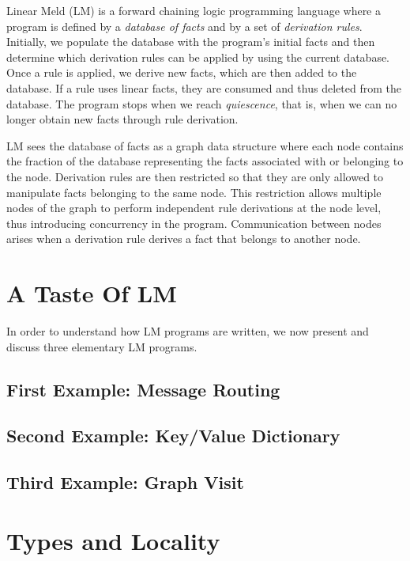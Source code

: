 
Linear Meld (LM) is a forward chaining logic programming language where a
program is defined by a \emph{database of facts} and by a set of
\emph{derivation rules}. Initially, we populate the database with the program's
initial facts and then determine which derivation rules can be applied by using
the current database. Once a rule is applied, we derive new facts, which are
then added to the database. If a rule uses linear facts, they are consumed and
thus deleted from the database. The program stops when we reach
\emph{quiescence}, that is, when we can no longer obtain new facts through rule
derivation.

LM sees the database of facts as a graph data structure where each node contains
the fraction of the database representing the facts associated with or belonging
to the node. Derivation rules are then restricted so that they are only allowed
to manipulate facts belonging to the same node.  This restriction allows
multiple nodes of the graph to perform independent rule derivations at the node
level, thus introducing concurrency in the program.  Communication between nodes
arises when a derivation rule derives a fact that belongs to another node.

\section{A Taste Of LM}

In order to understand how LM programs are written, we now present and discuss
three elementary LM programs.

\subsection{First Example: Message Routing}\label{section:language:message}


\subsection{Second Example: Key/Value Dictionary}\label{sec:language:key_value}


\subsection{Third Example: Graph Visit}


\section{Types and Locality}

